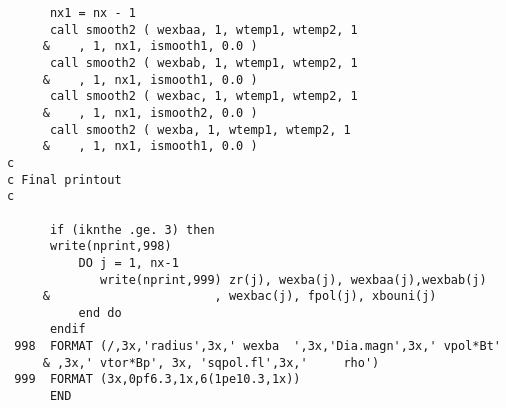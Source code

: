 \begin{verbatim}
      nx1 = nx - 1	
      call smooth2 ( wexbaa, 1, wtemp1, wtemp2, 1
     &    , 1, nx1, ismooth1, 0.0 )
      call smooth2 ( wexbab, 1, wtemp1, wtemp2, 1
     &    , 1, nx1, ismooth1, 0.0 )
      call smooth2 ( wexbac, 1, wtemp1, wtemp2, 1
     &    , 1, nx1, ismooth2, 0.0 )
      call smooth2 ( wexba, 1, wtemp1, wtemp2, 1
     &    , 1, nx1, ismooth1, 0.0 )
c
c Final printout
c

      if (iknthe .ge. 3) then
      write(nprint,998)
          DO j = 1, nx-1
             write(nprint,999) zr(j), wexba(j), wexbaa(j),wexbab(j)
     &                       , wexbac(j), fpol(j), xbouni(j)
          end do
      endif
 998  FORMAT (/,3x,'radius',3x,' wexba  ',3x,'Dia.magn',3x,' vpol*Bt'
     & ,3x,' vtor*Bp', 3x, 'sqpol.fl',3x,'     rho')
 999  FORMAT (3x,0pf6.3,1x,6(1pe10.3,1x))
      END
\end{verbatim}

